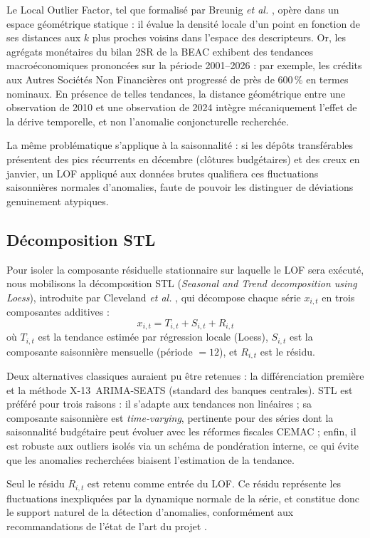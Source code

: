 \documentclass[12pt, a4paper]{article}
\begin{document}
Le Local Outlier Factor, tel que formalisé par Breunig \textit{et al.}
\cite{breunig2000lof}, opère dans un espace géométrique statique : il évalue
la densité locale d'un point en fonction de ses distances aux $k$ plus proches
voisins dans l'espace des descripteurs. Or, les agrégats monétaires du bilan
2SR de la BEAC exhibent des tendances macroéconomiques prononcées sur la
période 2001--2026 : par exemple, les crédits aux Autres Sociétés Non
Financières ont progressé de près de $600\,\%$ en termes nominaux. En présence
de telles tendances, la distance géométrique entre une observation de 2010 et
une observation de 2024 intègre mécaniquement l'effet de la dérive temporelle,
et non l'anomalie conjoncturelle recherchée.

La même problématique s'applique à la saisonnalité : si les dépôts
transférables présentent des pics récurrents en décembre (clôtures budgétaires)
et des creux en janvier, un LOF appliqué aux données brutes qualifiera ces
fluctuations saisonnières normales d'anomalies, faute de pouvoir les distinguer
de déviations genuinement atypiques.

\subsection{Décomposition STL}
\label{subsec:stl}

Pour isoler la composante résiduelle stationnaire sur laquelle le LOF sera
exécuté, nous mobilisons la décomposition STL (\textit{Seasonal and Trend
decomposition using Loess}), introduite par Cleveland \textit{et al.}
\cite{cleveland1990stl}, qui décompose chaque série $x_{i,t}$ en trois
composantes additives :
\[
    x_{i,t} = T_{i,t} + S_{i,t} + R_{i,t}
\]
où $T_{i,t}$ est la tendance estimée par régression locale (Loess),
$S_{i,t}$ est la composante saisonnière mensuelle (période $= 12$),
et $R_{i,t}$ est le résidu.

Deux alternatives classiques auraient pu être retenues : la différenciation
première et la méthode X-13~ARIMA-SEATS (standard des banques centrales).
STL est préféré pour trois raisons : il s'adapte aux tendances non linéaires ;
sa composante saisonnière est \textit{time-varying}, pertinente pour des séries
dont la saisonnalité budgétaire peut évoluer avec les réformes fiscales CEMAC ;
enfin, il est robuste aux outliers isolés via un schéma de pondération interne,
ce qui évite que les anomalies recherchées biaisent l'estimation de la
tendance.

Seul le résidu $R_{i,t}$ est retenu comme entrée du LOF. Ce résidu représente
les fluctuations inexpliquées par la dynamique normale de la série, et
constitue donc le support naturel de la détection d'anomalies, conformément
aux recommandations de l'état de l'art du projet \cite{moukoko2025etatart}.
\end{document}
